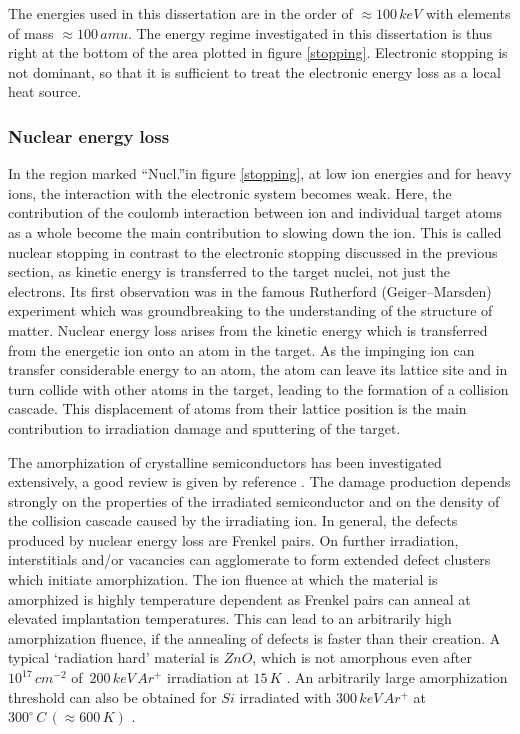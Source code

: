 The energies used in this dissertation are in the order of $\approx 100\,keV$ with elements of mass $\approx 100\,amu$. The energy regime investigated in this dissertation is thus right at the bottom of the area plotted in figure \ref{stopping}. Electronic stopping is not dominant, so that it is sufficient to treat the electronic energy loss as a local heat source.

\subsubsection{Nuclear energy loss}

In the region marked ``Nucl.''in figure \ref{stopping}, at low ion energies and for heavy ions, the interaction with the electronic system becomes weak. Here, the contribution of the coulomb interaction between ion and individual target atoms as a whole become the main contribution to slowing down the ion. This is called nuclear stopping in contrast to the electronic stopping discussed in the previous section, as kinetic energy is transferred to the target nuclei, not just the electrons. Its first observation was in the famous Rutherford (Geiger–Marsden) experiment \cite{rutherford_scattering_1911} which was groundbreaking to the understanding of the structure of matter. Nuclear energy loss arises from the kinetic energy which is transferred from the energetic ion onto an atom in the target. As the impinging ion can transfer considerable energy to an atom, the atom can leave its lattice site and in turn collide with other atoms in the target, leading to the formation of a collision cascade. This displacement of atoms from their lattice position is the main contribution to irradiation damage and sputtering of the target. 

The amorphization of crystalline semiconductors has been investigated extensively, a good review is given by reference \cite{wesch_damage_2012}. The damage production depends strongly on the properties of the irradiated semiconductor and on the density of the collision cascade caused by the irradiating ion. In general, the defects produced by nuclear energy loss are Frenkel pairs. On further irradiation, interstitials and/or vacancies can agglomerate to form extended defect clusters which initiate amorphization. The ion fluence at which the material is amorphized is highly temperature dependent as Frenkel pairs can anneal at elevated implantation temperatures. This can lead to an arbitrarily high amorphization fluence, if the annealing of defects is faster than their creation. A typical `radiation hard' material is $ZnO$, which is not amorphous even after $10^{17}\,cm^{-2}$ of $\,200\,keV\,Ar^+$ irradiation at $15\,K$ \cite{wesch_damage_2012}. An arbitrarily large amorphization threshold can also be obtained for $Si$ irradiated with $300\,keV\,Ar^+$ at $300^\circ\,C\,(\approx 600\,K)$ \cite{pelaz_ion-beam-induced_2004}.

